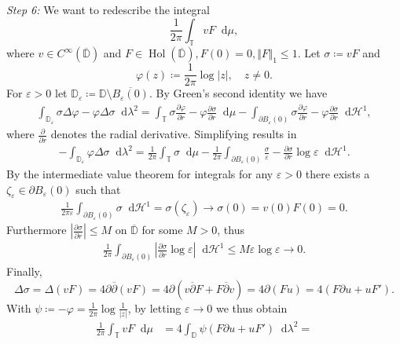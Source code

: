 \documentclass[letterpaper, 11pt]{article}
\newcommand{\D}{\mathbb{D}}
\newcommand{\T}{\mathbb{T}}
\newcommand{\1}{\mathds{1}}
\newcommand{\dd}{\mathop{}\!\mathrm{d}}
\newcommand{\cl}[1]{\overline{#1}}
\newcommand{\wirtz}{\partial}
\newcommand{\wirtzbar}{\overline{\partial}}
\DeclareMathOperator*{\Hol}{Hol}
\theoremstyle{definition}
\newenvironment{innerproof}
 {\renewcommand{\qedsymbol}{}\proof}
 {\endproof}
\begin{document}
\begin{innerproof}[Proof (continued)]
  \textit{Step 6:} We want to redescribe the integral
  $$ \frac{1}{2\pi} \int_\T v F \dd \mu, $$
  where $v \in C^\infty(\cl{\D})$ and $F \in \Hol(\cl{\D}), F(0) = 0, \Vert F \Vert_1 \leq 1$. Let $\sigma \coloneqq v F$ and
  $$ \varphi(z) \coloneqq \frac{1}{2\pi} \log \vert z \vert, \quad z \neq 0. $$
  For $\varepsilon > 0$ let $\D_\varepsilon \coloneqq \D \setminus \cl{B_\varepsilon(0)}$. By Green's second identity we have
  \begin{align*}
    \int_{\D_\varepsilon} \sigma \Delta \varphi - \varphi \Delta \sigma \dd \lambda^2 = \int_\T \sigma \frac{\partial \varphi}{\partial r} - \varphi \frac{\partial \sigma}{\partial r} \dd \mu - \int_{\partial B_\varepsilon(0)} \sigma \frac{\partial \varphi}{\partial r} - \varphi \frac{\partial \sigma}{\partial r} \dd \mathcal{H}^1,
  \end{align*}
  where $\frac{\partial}{\partial r}$ denotes the radial derivative. Simplifying results in
  \begin{align*}
    -\int_{\D_\varepsilon} \varphi \Delta \sigma \dd \lambda^2 = \frac{1}{2 \pi} \int_\T \sigma \dd \mu - \frac{1}{2 \pi} \int_{\partial B_\varepsilon(0)} \frac{\sigma}{\varepsilon} - \frac{\partial \sigma}{\partial r} \log \varepsilon \dd \mathcal{H}^1.
  \end{align*}
  By the intermediate value theorem for integrals for any $\varepsilon > 0$ there exists a $\zeta_\varepsilon \in \partial B_\varepsilon(0)$ such that
  \begin{align*}
    \frac{1}{2\pi\varepsilon} \int_{\partial B_\varepsilon(0)} \sigma \dd \mathcal{H}^1 = \sigma(\zeta_\varepsilon) \to \sigma(0) = v(0) F(0) = 0.
  \end{align*}
  Furthermore $\left\vert \frac{\partial \sigma}{\partial r} \right\vert \leq M$ on $\cl{\D}$ for some $M > 0$, thus
  \begin{align*}
    \frac{1}{2\pi} \int_{\partial B_\varepsilon(0)} \left\vert \frac{\partial \sigma}{\partial r} \log \varepsilon \right\vert \dd \mathcal{H}^1 \leq M \varepsilon \log \varepsilon \to 0.
  \end{align*}
  Finally,
  $$ \Delta \sigma = \Delta (v F) = 4 \wirtz \wirtzbar (v F) = 4 \wirtz (v \wirtzbar F + F \wirtzbar v) = 4\wirtz(F u) = 4(F \wirtz u + u F'). $$
  With $\psi \coloneqq -\varphi = \frac{1}{2\pi} \log \frac{1}{\vert z \vert}$, by letting $\varepsilon \to 0$ we thus obtain
  \begin{align*}
    \frac{1}{2 \pi} \int_\T v F \dd \mu &= 4 \int_\D \psi \left( F \wirtz u + u F' \right) \dd \lambda^2 = \\ 

\end{align*}
\end{innerproof}
\end{document}
